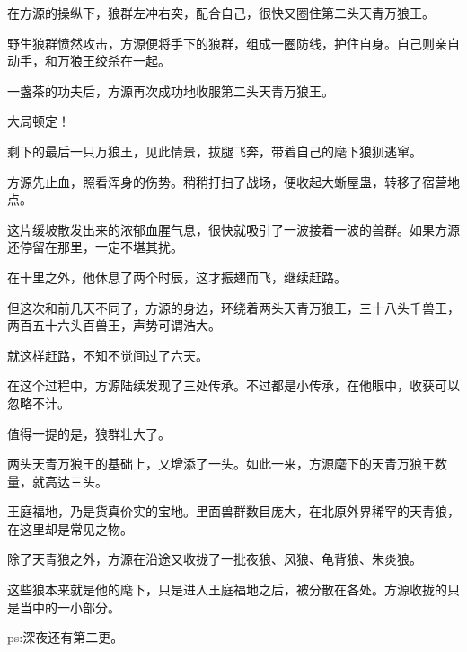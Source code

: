 \begin{this_body}
在方源的操纵下，狼群左冲右突，配合自己，很快又圈住第二头天青万狼王。

野生狼群愤然攻击，方源便将手下的狼群，组成一圈防线，护住自身。自己则亲自动手，和万狼王绞杀在一起。

一盏茶的功夫后，方源再次成功地收服第二头天青万狼王。

大局顿定！

剩下的最后一只万狼王，见此情景，拔腿飞奔，带着自己的麾下狼狈逃窜。

方源先止血，照看浑身的伤势。稍稍打扫了战场，便收起大蜥屋蛊，转移了宿营地点。

这片缓坡散发出来的浓郁血腥气息，很快就吸引了一波接着一波的兽群。如果方源还停留在那里，一定不堪其扰。

在十里之外，他休息了两个时辰，这才振翅而飞，继续赶路。

但这次和前几天不同了，方源的身边，环绕着两头天青万狼王，三十八头千兽王，两百五十六头百兽王，声势可谓浩大。

就这样赶路，不知不觉间过了六天。

在这个过程中，方源陆续发现了三处传承。不过都是小传承，在他眼中，收获可以忽略不计。

值得一提的是，狼群壮大了。

两头天青万狼王的基础上，又增添了一头。如此一来，方源麾下的天青万狼王数量，就高达三头。

王庭福地，乃是货真价实的宝地。里面兽群数目庞大，在北原外界稀罕的天青狼，在这里却是常见之物。

除了天青狼之外，方源在沿途又收拢了一批夜狼、风狼、龟背狼、朱炎狼。

这些狼本来就是他的麾下，只是进入王庭福地之后，被分散在各处。方源收拢的只是当中的一小部分。

ps:深夜还有第二更。

\end{this_body}

